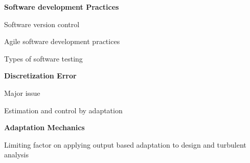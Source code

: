 \documentclass[landscape]{slides}
\renewcommand{\title}[1]{{\large\bfseries #1}}
\newenvironment{itemiz}%
  {\begin{list}{}{\raggedright
      \setlength{\itemsep}{2pt}%
      \setlength{\parskip}{4pt}\setlength{\parsep}{2pt}}}%
  {\end{list}}%
\begin{document}
 \begin{slide}
   \title{ Software development Practices }
   \begin{itemiz}
   \item Software version control
   \item Agile software development practices
   \item Types of software testing
   \end{itemiz}
   \title{ Discretization Error }
   \begin{itemiz}
   \item Major issue
   \item Estimation and control by adaptation
   \end{itemiz}
   \title{ Adaptation Mechanics }
   \begin{itemiz}
   \item Limiting factor on applying output based adaptation to design
   and turbulent analysis
   \end{itemiz}
 \end{slide}
 
\end{document}
